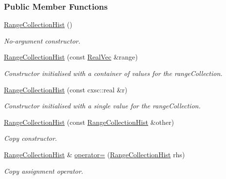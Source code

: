 \subsubsection*{\-Public \-Member \-Functions}
\begin{DoxyCompactItemize}
\item 
\hyperlink{classsubpavings_1_1RangeCollectionHist_a1798364905b4d4db8aa0ffa922dbc169}{\-Range\-Collection\-Hist} ()
\begin{DoxyCompactList}\small\item\em \-No-\/argument constructor. \end{DoxyCompactList}\item 
\hyperlink{classsubpavings_1_1RangeCollectionHist_aa65c6d75a4a00028029ce18407df9c21}{\-Range\-Collection\-Hist} (const \hyperlink{namespacesubpavings_af2d57bb6e12f4a73169f2e496d6a641f}{\-Real\-Vec} \&range)
\begin{DoxyCompactList}\small\item\em \-Constructor initialised with a container of values for the range\-Collection. \end{DoxyCompactList}\item 
\hyperlink{classsubpavings_1_1RangeCollectionHist_a5da6271ef9e881f17213072a05859636}{\-Range\-Collection\-Hist} (const cxsc\-::real \&r)
\begin{DoxyCompactList}\small\item\em \-Constructor initialised with a single value for the range\-Collection. \end{DoxyCompactList}\item 
\hyperlink{classsubpavings_1_1RangeCollectionHist_af282eb9e98612d1da0eae417088d2018}{\-Range\-Collection\-Hist} (const \hyperlink{classsubpavings_1_1RangeCollectionHist}{\-Range\-Collection\-Hist} \&other)
\begin{DoxyCompactList}\small\item\em \-Copy constructor. \end{DoxyCompactList}\item 
\hyperlink{classsubpavings_1_1RangeCollectionHist}{\-Range\-Collection\-Hist} \& \hyperlink{classsubpavings_1_1RangeCollectionHist_ad06f912d9345fb484445d352e2bb7348}{operator=} (\hyperlink{classsubpavings_1_1RangeCollectionHist}{\-Range\-Collection\-Hist} rhs)
\begin{DoxyCompactList}\small\item\em \-Copy assignment operator. \end{DoxyCompactList}\item 

\end{DoxyCompactItemize}
